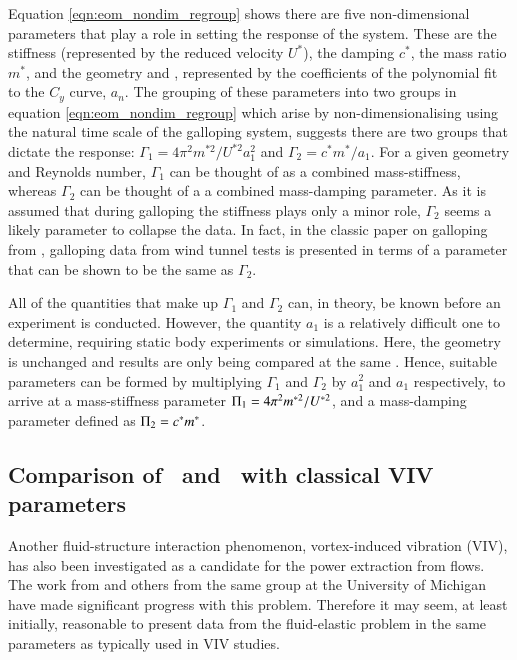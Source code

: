 Equation \ref{eqn:eom_nondim_regroup} shows there are five non-dimensional parameters that play a role in setting the response of the system. These are the stiffness (represented by the reduced velocity $U^*$), the damping $c^*$, the mass ratio $m^*$, and the geometry and \reynoldsnumber, represented by the coefficients of the polynomial fit to the $C_y$ curve, $a_n$. The grouping of these parameters into two groups in equation \ref{eqn:eom_nondim_regroup} which arise by non-dimensionalising using the natural time scale of the galloping system, suggests there are two groups that dictate the response: $\Gamma_1 = 4\pi^2m^{*2}/U^{*2}a_1^2$ and $\Gamma_2 = c^*m^*/a_1$. For a given geometry and Reynolds number, $\Gamma_1$ can be thought of as a combined mass-stiffness, whereas $\Gamma_2$ can be thought of a a combined mass-damping parameter. As it is assumed that during galloping the stiffness plays only a minor role, $\Gamma_2$ seems a likely parameter to collapse the data. In fact, in the classic paper on galloping from \cite{Parkinson1964}, galloping data from wind tunnel tests is presented in terms of a parameter that can be shown to be the same as $\Gamma_2$.
 
 All of the quantities that make up $\Gamma_1$ and $\Gamma_2$ can, in theory, be known before an experiment is conducted. However, the quantity $a_1$ is a relatively difficult one to determine, requiring static body experiments or simulations. Here, the geometry is unchanged and results are only being compared at the same \reynoldsnumber. Hence, suitable parameters can be formed by multiplying $\Gamma_1$ and $\Gamma_2$ by $a_1^2$ and $a_1$ respectively, to arrive at a mass-stiffness parameter $\Pi_1 =  4\pi^2m^{*2}/U^{*2}$, and a mass-damping parameter defined as $\Pi_2 = c^*m^*$.
 
 \subsection{Comparison of \massstiff \ and \massdamp \ with classical VIV parameters}
\label{sec:new_vs_viv}

Another fluid-structure interaction phenomenon, vortex-induced vibration (VIV), has also been investigated as a candidate for the power extraction from flows. The work from \citet{Bernitsas2008a-concept, Bernitsas2009, Raghavan2010a, Lee2011b} and others from the same group at the University of Michigan have made significant progress with this problem. Therefore it may seem, at least initially, reasonable to present data from the fluid-elastic problem in the same parameters as typically used in VIV studies.
  
